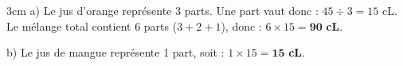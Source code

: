\documentclass[a4paper]{book}
\begin{document}
{\begin{exercice}
        \begin{ZoneReponse}{3cm}
            a) Le jus d'orange représente 3 parts. Une part vaut donc : $45 \div 3 = 15$ cL. \\
            Le mélange total contient 6 parts ($3+2+1$), donc : $6 \times 15 = \mathbf{90}$ \textbf{cL}. 

            \medskip
            
            b) Le jus de mangue représente 1 part, soit : $1 \times 15 = \mathbf{15}$ \textbf{cL}.
        \end{ZoneReponse}
    \end{exercice}

    
}
\end{document}
